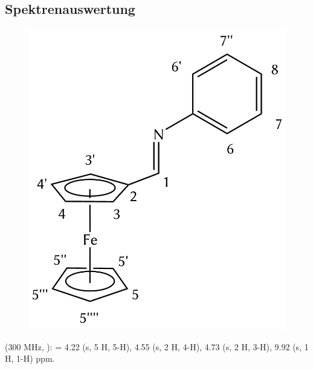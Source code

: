 \documentclass[12pt]{article}
\begin{document}
\begin{onehalfspace}
\section{Spektrenauswertung}
\begin{figure}[!ht]
   \centering
\includegraphics[scale=0.3]{auswert.png}
\end{figure}
\noindent
\textbf{} (300 MHz, ): \ce{$\delta$} = 
4.22 (s, 5 H, 5-H),
4.55 (s, 2 H, 4-H),
4.73 (s, 2 H, 3-H),
9.92 (s, 1 H, 1-H) ppm.

\end{onehalfspace}
\end{document}
